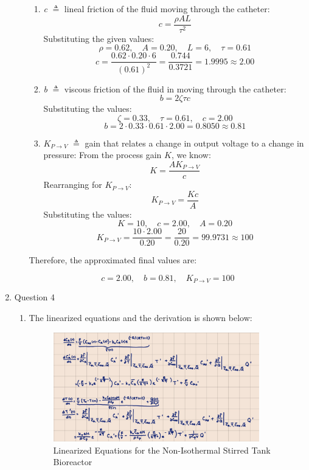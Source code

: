 \documentclass[12pt]{article}
\begin{document}
\begin{enumerate}
\begin{enumerate}
    \begin{enumerate}
      \item \textit{c} $\triangleq$ lineal friction of the fluid moving through the catheter:
      \[
        c = \frac{\rho A L}{\tau^2}
        \]
        Substituting the given values:
        \[
        \rho = 0.62, \quad A = 0.20, \quad L = 6, \quad \tau = 0.61
        \]
        \[
        c = \frac{0.62 \cdot 0.20 \cdot 6}{(0.61)^2} = \frac{0.744}{0.3721} = 1.9995 \approx 2.00
        \]
    
        \item \textit{b} $\triangleq$ viscous friction of the fluid in moving through the catheter:
        \[
        b = 2\zeta\tau c
        \]
        Substituting the values:
        \[
        \zeta = 0.33, \quad \tau = 0.61, \quad c = 2.00
        \]
        \[
        b = 2 \cdot 0.33 \cdot 0.61 \cdot 2.00 = 0.8050 \approx 0.81
        \]
    
        \item \textit{$K_{P \to V}$} $\triangleq$ gain that relates a change in output voltage to a change in pressure:
        From the process gain \(K\), we know:
        \[
        K = \frac{A K_{P \to V}}{c}
        \]
        Rearranging for \(K_{P \to V}\):
        \[
        K_{P \to V} = \frac{K c}{A}
        \]
        Substituting the values:
        \[
        K = 10, \quad c = 2.00, \quad A = 0.20
        \]
        \[
        K_{P \to V} = \frac{10 \cdot 2.00}{0.20} = \frac{20}{0.20} = 99.9731 \approx 100
        \]
    \end{enumerate}
    
    Therefore, the approximated final values are:
    
    \[
    c = 2.00, \quad b = 0.81, \quad K_{P \to V} = 100
    \]

  \end{enumerate}

  \pagebreak

  \item Question 4
    \begin{enumerate}
    \item
    The linearized equations and the derivation is shown below:

    \begin{figure}[H]
      \centering
      \includegraphics[width=0.9\textwidth]{Figures/handcalc/figure4-1.png}
      \caption{Linearized Equations for the Non-Isothermal Stirred Tank Bioreactor}
      \label{fig:figure41}
    \end{figure}


\end{enumerate}
\end{enumerate}
\end{document}
